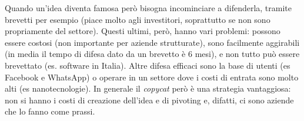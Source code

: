 \begin{itemize}
 Quando un'idea diventa famosa però bisogna incominciare a
 difenderla, tramite brevetti per esempio (piace molto agli investitori,
 soprattutto se non sono propriamente del settore). Questi ultimi, però, hanno
 vari problemi: possono essere costosi (non importante per aziende strutturate),
 sono facilmente aggirabili (in media il tempo di difesa dato da un brevetto
 è 6 mesi), e non tutto può essere brevettato (es. software in Italia). Altre
 difesa efficaci sono la base di utenti (es Facebook e WhatsApp) o operare in
 un settore dove i costi di entrata sono molto alti (es nanotecnologie). In
 generale il \textit{copycat} però è una strategia vantaggiosa: non si hanno i
 costi di creazione dell'idea e di pivoting e, difatti, ci sono aziende che lo
 fanno come prassi.
\end{itemize}
